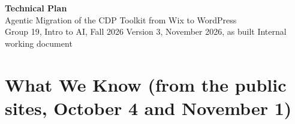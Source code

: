 
\usepackage{listings}


\begin{center}
{\LARGE\bfseries Technical Plan}\\[3pt]
{\large Agentic Migration of the CDP Toolkit from Wix to WordPress}\\[2pt]
{\small Group 19, Intro to AI, Fall 2026 \textbullet{} Version 3, November 2026, as built \textbullet{} Internal working document}
\end{center}

\section{What We Know (from the public sites, October 4 and November 1)}
